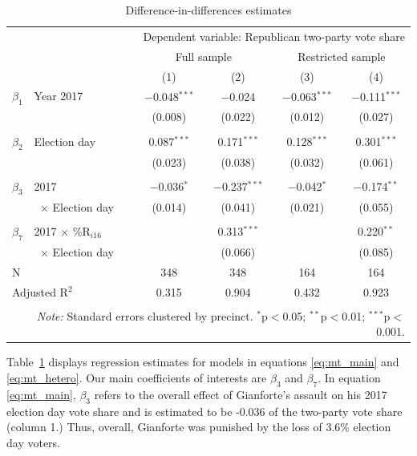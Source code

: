 \documentclass[letterpaper, 12pt]{article}
\begin{document}
\begin{raggedright}
\begin{table}[!tb]
\centering
\caption{Difference-in-differences estimates}
\small
\label{tab:mt_reg_main}
\begin{tabular}{@{\extracolsep{4pt}}lcccc}
\toprule
\multicolumn{5}{r}{Dependent variable: Republican two-party vote share} \\
& \multicolumn{2}{c}{Full sample} & \multicolumn{2}{c}{Restricted sample} \\ & (1) & (2) & (3) & (4)\\
\midrule
$\beta_1$~~Year 2017& $-$0.048$^{***}$ & $-$0.024 & $-$0.063$^{***}$ & $-$0.111$^{***}$ \\
& (0.008) & (0.022) & (0.012) & (0.027) \\
& & & & \\[-1.5ex]
$\beta_2$~~Election day & 0.087$^{***}$ & 0.171$^{***}$ & 0.128$^{***}$ & 0.301$^{***}$ \\
& (0.023) & (0.038) & (0.032) & (0.061) \\
& & & & \\[-1.5ex]
$\beta_3$~~2017 & $-$0.036$^{*}$ & $-$0.237$^{***}$ & $-$0.042$^{*}$ & $-$0.174$^{**}$ \\
~~~~~$\times$ Election day & (0.014) & (0.041) & (0.021) & (0.055) \\
& & & & \\[-1.5ex]
$\beta_7$~~2017 $\times$ \%R$_{i16}$ & & 0.313$^{***}$ & & 0.220$^{**}$ \\
~~~~~$\times$ Election day & & (0.066) & & (0.085) \\
\midrule
N & 348 & 348 & 164 & 164 \\
Adjusted R$^{2}$ & 0.315 & 0.904 & 0.432 & 0.923 \\
\bottomrule \\[-2.7ex]
\multicolumn{5}{r}{\footnotesize\textit{Note:} Standard errors clustered by precinct. $^{*}$p$<$0.05; $^{**}$p$<$0.01; $^{***}$p$<$0.001.} \\
\end{tabular}
\end{table}

Table~\ref{tab:mt_reg_main} displays regression estimates for models in equations \eqref{eq:mt_main} and \eqref{eq:mt_hetero}. Our main coefficients of interests are $\beta_3$ and $\beta_7$. In equation \eqref{eq:mt_main}, $\beta_3$ refers to the overall effect of Gianforte's assault on his 2017 election day vote share and is estimated to be -0.036 of the two-party vote share (column 1.) Thus, overall, Gianforte was punished by the loss of 3.6\% election day voters.


\end{raggedright}
\end{document}
